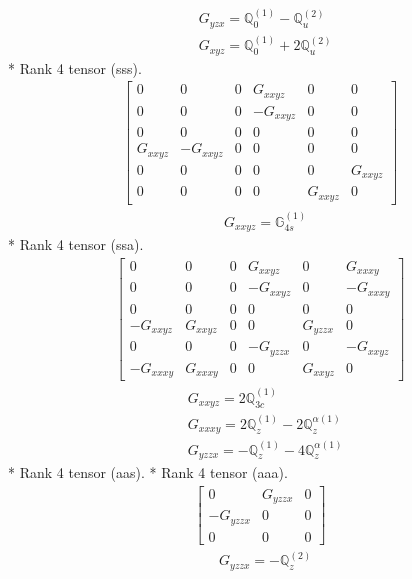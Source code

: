 \documentclass[fleqn,8pt,landscape]{jsarticle}
\begin{document}
\begin{align*}
& G_{yzx} = \mathbb{Q}_{0}^{(1)} - \mathbb{Q}_{u}^{(2)} \\
& G_{xyz} = \mathbb{Q}_{0}^{(1)} + 2 \mathbb{Q}_{u}^{(2)}
\end{align*}
* Rank 4 tensor (sss).
\begin{align*}
\begin{bmatrix} 0 & 0 & 0 & G_{xxyz} & 0 & 0 \\ 0 & 0 & 0 & - G_{xxyz} & 0 & 0 \\ 0 & 0 & 0 & 0 & 0 & 0 \\ G_{xxyz} & - G_{xxyz} & 0 & 0 & 0 & 0 \\ 0 & 0 & 0 & 0 & 0 & G_{xxyz} \\ 0 & 0 & 0 & 0 & G_{xxyz} & 0 \end{bmatrix}
\end{align*}
\begin{align*}
& G_{xxyz} = \mathbb{G}_{4s}^{(1)}
\end{align*}
* Rank 4 tensor (ssa).
\begin{align*}
\begin{bmatrix} 0 & 0 & 0 & G_{xxyz} & 0 & G_{xxxy} \\ 0 & 0 & 0 & - G_{xxyz} & 0 & - G_{xxxy} \\ 0 & 0 & 0 & 0 & 0 & 0 \\ - G_{xxyz} & G_{xxyz} & 0 & 0 & G_{yzzx} & 0 \\ 0 & 0 & 0 & - G_{yzzx} & 0 & - G_{xxyz} \\ - G_{xxxy} & G_{xxxy} & 0 & 0 & G_{xxyz} & 0 \end{bmatrix}
\end{align*}
\begin{align*}
& G_{xxyz} = 2 \mathbb{Q}_{3c}^{(1)} \\
& G_{xxxy} = 2 \mathbb{Q}_{z}^{(1)} - 2 \mathbb{Q}_{z}^{\alpha(1)} \\
& G_{yzzx} = - \mathbb{Q}_{z}^{(1)} - 4 \mathbb{Q}_{z}^{\alpha(1)}
\end{align*}
* Rank 4 tensor (aas).
* Rank 4 tensor (aaa).
\begin{align*}
\begin{bmatrix} 0 & G_{yzzx} & 0 \\ - G_{yzzx} & 0 & 0 \\ 0 & 0 & 0 \end{bmatrix}
\end{align*}
\begin{align*}
& G_{yzzx} = - \mathbb{Q}_{z}^{(2)}
\end{align*}
\end{document}
